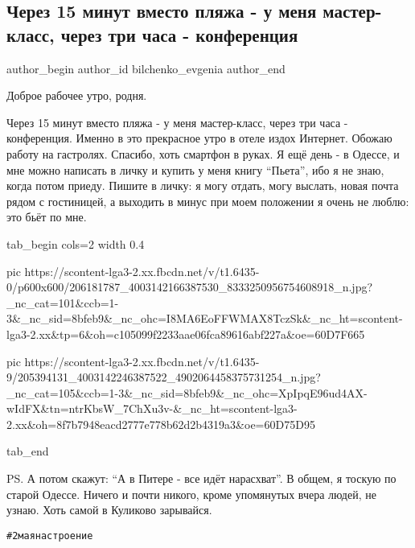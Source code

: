  
 
 
 
 
 
\subsection{Через 15 минут вместо пляжа - у меня мастер-класс, через три часа - конференция}
\label{sec:23_06_2021.fb.bilchenko_evgenia.5.dobroje_utro}
\ifcmt
 author_begin
   author_id bilchenko_evgenia
 author_end
\fi

Доброе рабочее утро, родня. 

Через 15 минут вместо пляжа - у меня мастер-класс, через три часа -
конференция. Именно в это прекрасное утро в отеле издох Интернет. Обожаю работу
на гастролях. Спасибо, хоть смартфон в руках. Я ещё день - в Одессе, и мне
можно написать в личку и купить у меня книгу \enquote{Пьета}, ибо я не знаю, когда
потом приеду. Пишите в личку: я могу отдать, могу выслать, новая почта рядом с
гостиницей, а выходить в минус при моем положении я очень не люблю: это бьёт по
мне. 


\ifcmt
  tab_begin cols=2
		 width 0.4

     pic https://scontent-lga3-2.xx.fbcdn.net/v/t1.6435-0/p600x600/206181787_4003142166387530_8333250956754608918_n.jpg?_nc_cat=101&ccb=1-3&_nc_sid=8bfeb9&_nc_ohc=I8MA6EoFFWMAX8TczSk&_nc_ht=scontent-lga3-2.xx&tp=6&oh=c105099f2233aae06fca89616abf227a&oe=60D7F665

     pic https://scontent-lga3-2.xx.fbcdn.net/v/t1.6435-9/205394131_4003142246387522_4902064458375731254_n.jpg?_nc_cat=105&ccb=1-3&_nc_sid=8bfeb9&_nc_ohc=XpIpqE96ud4AX-wIdFX&tn=ntrKbsW_7ChXu3v-&_nc_ht=scontent-lga3-2.xx&oh=8f7b7948eacd2777e778b62d2b4319a3&oe=60D75D95

  tab_end
\fi


PS. А потом скажут: \enquote{А в Питере - все идёт нарасхват}. В общем, я
тоскую по старой Одессе. Ничего и почти никого, кроме упомянутых вчера людей,
не узнаю.  Хоть самой в Куликово зарывайся. 

\verb|#2маянастроение|
